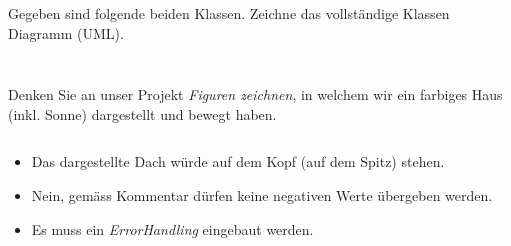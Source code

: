 \documentclass[12pt,a4paper]{exam}
\begin{document}
    \begin{questions}

        \question[10] Gegeben sind folgende beiden Klassen. Zeichne das vollständige
        Klassen Diagramm (UML).

        \begin{minipage}{0.45\textwidth}
            \inputminted[autogobble,linenos,frame=single]{java}{../java/academy/One.java}
        \end{minipage}
        \begin{minipage}{0.49\textwidth}
            \inputminted[autogobble,frame=single]{java}{../java/academy/Two.java}
        \end{minipage}
        \makeemptybox{5cm}

        \addpoints

        \newpage
        \question Denken Sie an unser Projekt \emph{Figuren zeichnen}, in welchem
        wir ein farbiges Haus (inkl. Sonne) dargestellt und bewegt haben.


        \inputminted[autogobble,firstline=31,lastline=39]
        {java}{../java/figures/Triangle.java}

        \ifprintanswers
        \begin{solution}
            \begin{itemize}
                \item Das dargestellte Dach würde auf dem Kopf (auf dem Spitz) stehen.
                \item Nein, gemäss Kommentar dürfen keine negativen Werte übergeben werden.
                \item Es muss ein \emph{ErrorHandling} eingebaut werden.
            \end{itemize}
        \end{solution}
        \else\makeemptybox{2in}
        \fi


\end{questions}
\end{document}
